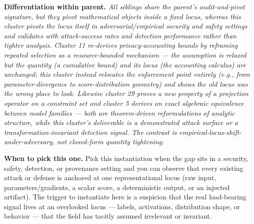 \begin{tcolorbox}[colback=bgskill!50, colframe=cgreen!70, title={\textbf{C01} \textcolor{gray}{\small (O20/H9/R21)}}, breakable, before skip=4pt, after skip=4pt]
\begin{enumerate}[leftmargin=14pt,topsep=2pt,itemsep=1pt]
\end{enumerate}
\textbf{Differentiation within parent.} \textit{All siblings share the parent's audit-and-pivot signature, but they pivot mathematical objects inside a fixed locus, whereas this cluster pivots the locus itself in adversarial/empirical security and safety settings and validates with attack-success rates and detection performance rather than tighter analysis. Cluster 11 re-derives privacy-accounting bounds by reframing repeated selection as a resource-bounded mechanism --- the assumption is relaxed but the quantity (a cumulative bound) and its locus (the accounting calculus) are unchanged; this cluster instead relocates the enforcement point entirely (e.g., from parameter-divergence to score-distribution geometry) and shows the old locus was the wrong place to look. Likewise cluster 29 proves a new property of a projection operator on a constraint set and cluster 5 derives an exact algebraic equivalence between model families --- both are theorem-driven reformulations of analytic structure, while this cluster's deliverable is a demonstrated attack surface or a transformation-invariant detection signal. The contrast is empirical-locus-shift-under-adversary, not closed-form quantity tightening.}

\textbf{When to pick this one.} Pick this instantiation when the gap sits in a security, safety, detection, or provenance setting and you can observe that every existing attack or defense is anchored at one representational locus (raw input, parameters/gradients, a scalar score, a deterministic output, or an injected artifact). The trigger to instantiate here is a suspicion that the real load-bearing signal lives at an overlooked locus --- labels, activations, distribution shape, or behavior --- that the field has tacitly assumed irrelevant or invariant.


\end{tcolorbox}
